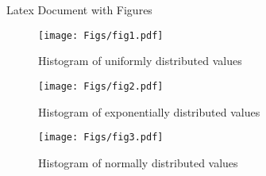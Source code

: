 \documentclass[12pt]{article}
\begin{document}
\huge{Latex Document with Figures}
\begin{figure}[!p]
\centering\texttt{[image: Figs/fig1.pdf]}
\caption{Histogram of uniformly distributed values}
\label{Fig1}
\end{figure}

\begin{figure}[!p]
    \centering\texttt{[image: Figs/fig2.pdf]}
    \caption{Histogram of exponentially distributed values}
    \label{Fig2}
    \end{figure}
    
    \begin{figure}[!p]
    \centering\texttt{[image: Figs/fig3.pdf]}
    \caption{Histogram of normally distributed values}
    \label{Fig3}
    \end{figure}
\end{document}
